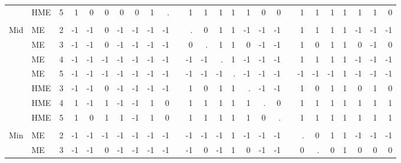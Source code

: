 \documentclass[12pt]{article}
\theoremstyle{definition}
\begin{document}
\begin{landscape}
\begin{table}[t!]
\begin{threeparttable}
{\begin{tabular}[r]{l l l r r r r r r r r r r r r r r r r r r r r r r r}
         & HME & 5       &  1  &  0  &  0  &  0  &  0   &  1   &   .          &&  1  &   1 &  1  &  1  &  1   &  0   &   0          &&  1  &  1  &  1  &  1  &  1   &  1   &  0       \\
         &     &         &     &     &     &     &      &      &              &&     &     &     &     &      &      &              &&     &     &     &     &      &      &          \\
Mid      & ME  & 2       & -1  & -1  &  0  & -1  & -1   & -1   &  -1          &&  .  &   0 &  1  &  1  & -1   & -1   &  -1          &&  1  &  1  &  1  &  1  & -1   & -1   & -1       \\
         & ME  & 3       & -1  & -1  &  0  & -1  & -1   & -1   &  -1          &&  0  &   . &  1  &  1  &  0   & -1   &  -1          &&  1  &  0  &  1  &  1  &  0   & -1   &  0       \\
         & ME  & 4       & -1  & -1  & -1  & -1  & -1   & -1   &  -1          && -1  &  -1 &  .  &  1  & -1   & -1   &  -1          &&  1  &  1  &  1  &  1  & -1   & -1   & -1       \\
         & ME  & 5       & -1  & -1  & -1  & -1  & -1   & -1   &  -1          && -1  &  -1 & -1  &  .  & -1   & -1   &  -1          && -1  & -1  & -1  &  1  & -1   & -1   & -1       \\
         & HME & 3       & -1  & -1  &  0  & -1  & -1   & -1   &  -1          &&  1  &   0 &  1  &  1  &  .   & -1   &  -1          &&  1  &  0  &  1  &  1  &  0   &  1   &  0       \\
         & HME & 4       &  1  & -1  &  1  & -1  & -1   &  1   &   0          &&  1  &   1 &  1  &  1  &  1   &  .   &   0          &&  1  &  1  &  1  &  1  &  1   &  1   &  1       \\
         & HME & 5       &  1  &  0  &  1  &  1  & -1   &  1   &   0          &&  1  &   1 &  1  &  1  &  1   &  0   &   .          &&  1  &  1  &  1  &  1  &  1   &  1   &  1       \\
         &     &         &     &     &     &     &      &      &              &&     &     &     &     &      &      &              &&     &     &     &     &      &      &          \\
Min      & ME  & 2       & -1  & -1  & -1  & -1  & -1   & -1   &  -1          && -1  &  -1 & -1  &  1  & -1   & -1   &  -1          &&  .  &  0  &  1  &  1  & -1   & -1   & -1       \\
         & ME  & 3       & -1  & -1  &  0  & -1  & -1   & -1   &  -1          && -1  &   0 & -1  &  1  &  0   & -1   &  -1          &&  0  &  .  &  0  &  1  &  0   &  0   &  0       \\

\end{tabular}}
\end{threeparttable}
\end{table}
\end{landscape}
\end{document}
